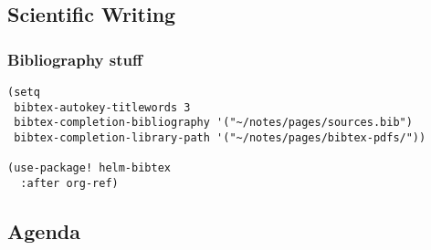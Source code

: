 \documentclass[11pt]{article}
\begin{document}
\subsection{Scientific Writing}
\label{sec:org464e323}

\subsubsection{Bibliography stuff}
\label{sec:orgfafcf8c}
\begin{verbatim}
(setq
 bibtex-autokey-titlewords 3
 bibtex-completion-bibliography '("~/notes/pages/sources.bib")
 bibtex-completion-library-path '("~/notes/pages/bibtex-pdfs/"))

(use-package! helm-bibtex
  :after org-ref)
\end{verbatim}

\subsection{Agenda}
\label{sec:org923429b}
\end{document}
